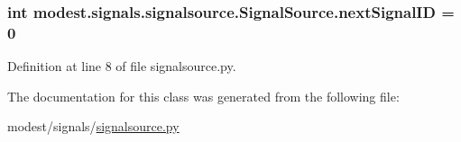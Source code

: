 \subsubsection[{\texorpdfstring{next\+Signal\+ID}{nextSignalID}}]{\setlength{\rightskip}{0pt plus 5cm}int modest.\+signals.\+signalsource.\+Signal\+Source.\+next\+Signal\+ID = 0\hspace{0.3cm}{\ttfamily [static]}}\hypertarget{classmodest_1_1signals_1_1signalsource_1_1SignalSource_a453eafb550b551adbec0903deb63dfce}{}\label{classmodest_1_1signals_1_1signalsource_1_1SignalSource_a453eafb550b551adbec0903deb63dfce}


Definition at line 8 of file signalsource.\+py.



The documentation for this class was generated from the following file\+:\begin{DoxyCompactItemize}
\item 
modest/signals/\hyperlink{signalsource_8py}{signalsource.\+py}\end{DoxyCompactItemize}
